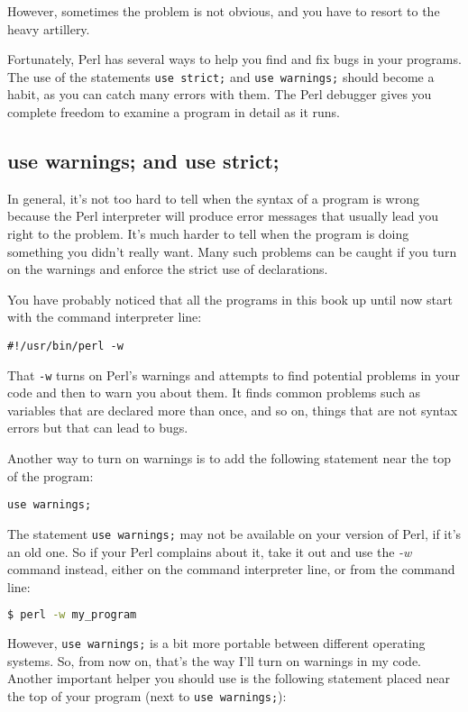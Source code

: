 However, sometimes the problem is not obvious, and you have to resort to the heavy artillery.

Fortunately, Perl has several ways to help you find and fix bugs in your programs. The use of the statements \verb|use strict;| and \verb|use warnings;| should become a habit, as you can catch many errors with them. The Perl debugger gives you complete freedom to examine a program in detail as it runs.

\subsection{use warnings; and use strict;}
In general, it's not too hard to tell when the syntax of a program is wrong because the Perl interpreter will produce error messages that usually lead you right to the problem. It's much harder to tell when the program is doing something you didn't really want. Many such problems can be caught if you turn on the warnings and enforce the strict use of declarations.

You have probably noticed that all the programs in this book up until now start with the command interpreter line:

\begin{lstlisting}
#!/usr/bin/perl -w
\end{lstlisting}

That \verb|-w| turns on Perl's warnings and attempts to find potential problems in your code and then to warn you about them. It finds common problems such as variables that are declared more than once, and so on, things that are not syntax errors but that can lead to bugs.

Another way to turn on warnings is to add the following statement near the top of the program:

\begin{lstlisting}
use warnings;
\end{lstlisting}

The statement \verb|use warnings;| may not be available on your version of Perl, if it's an old one. So if your Perl complains about it, take it out and use the \textit{-w} command instead, either on the command interpreter line, or from the command line:

\begin{lstlisting}[language=bash]
$ perl -w my_program
\end{lstlisting}

However, \verb|use warnings;| is a bit more portable between different operating systems. So, from now on, that's the way I'll turn on warnings in my code. Another important helper you should use is the following statement placed near the top of your program (next to \verb|use warnings;|):


